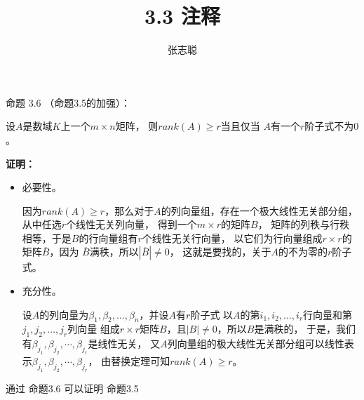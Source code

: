 \documentclass{article}
\begin{document}
\title{3.3 注释}
\author{张志聪}
\maketitle

\begin{zremark}
  命题 3.6 （命题3.5的加强）：

  设$A$是数域$K$上一个$m \times n$矩阵，
  则$rank(A) \geq r$当且仅当
  $A$有一个$r$阶子式不为$0$。
\end{zremark}

\textbf{证明：}

\begin{itemize}
  \item 必要性。

        因为$rank(A) \geq r$，那么对于$A$的列向量组，存在一个极大线性无关部分组，
        从中任选$r$个线性无关列向量，
        得到一个$m \times r$的矩阵$B$，
        矩阵的列秩与行秩相等，于是$B$的行向量组有$r$个线性无关行向量，
        以它们为行向量组成$r \times r$的矩阵$\overline{B}$，因为
        $\overline{B}$满秩，所以$|\overline{B}| \neq 0$，
        这就是要找的，关于$A$的不为零的$r$阶子式。

  \item 充分性。

        设$A$的列向量为$\beta_1, \beta_2, \dots, \beta_n$，并设$A$有$r$阶子式
        以$A$的第$i_1, i_2, \ldots, i_r$行向量和第$j_1, j_2, \ldots, j_r$列向量
        组成$r \times r$矩阵$B$，且$|B| \neq 0$，所以$B$是满秩的，
        于是，我们有$\beta_{j_1}, \beta_{j_2}, \cdots, \beta_{j_r}$是线性无关，
        又$A$列向量组的极大线性无关部分组可以线性表示$\beta_{j_1}, \beta_{j_2}, \cdots, \beta_{j_r}$，
        由替换定理可知$rank(A) \geq r$。
\end{itemize}

\begin{zremark}
  通过 命题3.6 可以证明 命题3.5
\end{zremark}
\end{document}

